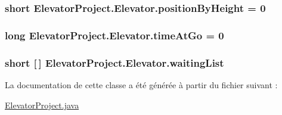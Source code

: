\hypertarget{classElevatorProject_1_1Elevator_ab1b368c5ffad580c3693bd7ada72285a}{
\subsubsection[{position\-By\-Height}]{\setlength{\rightskip}{0pt plus 5cm}short Elevator\-Project.\-Elevator.\-position\-By\-Height = 0\hspace{0.3cm}{\ttfamily [package]}}}\label{classElevatorProject_1_1Elevator_ab1b368c5ffad580c3693bd7ada72285a}
\hypertarget{classElevatorProject_1_1Elevator_a32824d3b94909aeb726937a62ed16775}{
\subsubsection[{time\-At\-Go}]{\setlength{\rightskip}{0pt plus 5cm}long Elevator\-Project.\-Elevator.\-time\-At\-Go = 0\hspace{0.3cm}{\ttfamily [package]}}}\label{classElevatorProject_1_1Elevator_a32824d3b94909aeb726937a62ed16775}
\hypertarget{classElevatorProject_1_1Elevator_a1a2cb5a9024a1aa576f3c41637eac36f}{
\subsubsection[{waiting\-List}]{\setlength{\rightskip}{0pt plus 5cm}short \mbox{[}$\,$\mbox{]} Elevator\-Project.\-Elevator.\-waiting\-List\hspace{0.3cm}{\ttfamily [package]}}}\label{classElevatorProject_1_1Elevator_a1a2cb5a9024a1aa576f3c41637eac36f}


La documentation de cette classe a été générée à partir du fichier suivant \-:\begin{DoxyCompactItemize}
\item 
\hyperlink{ElevatorProject_8java}{Elevator\-Project.\-java}\end{DoxyCompactItemize}
